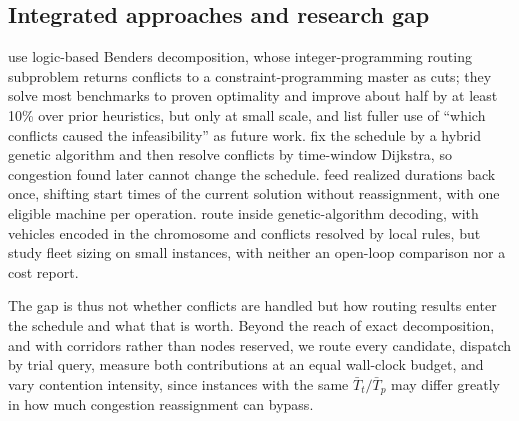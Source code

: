 \documentclass[preprint,review,12pt,authoryear,doubleblind]{elsarticle}
\begin{document}
\subsection{Integrated approaches and research gap}

 use logic-based Benders decomposition, whose integer-programming routing subproblem returns conflicts to a constraint-programming master as cuts; they solve most benchmarks to proven optimality and improve about half by at least 10\% over prior heuristics, but only at small scale, and list fuller use of ``which conflicts caused the infeasibility'' as future work.
\citet{sun2023integrated} fix the schedule by a hybrid genetic algorithm and then resolve conflicts by time-window Dijkstra, so congestion found later cannot change the schedule.
\citet{li2026framework} feed realized durations back once, shifting start times of the current solution without reassignment, with one eligible machine per operation.
\citet{lyu2019approach} route inside genetic-algorithm decoding, with vehicles encoded in the chromosome and conflicts resolved by local rules, but study fleet sizing on small instances, with neither an open-loop comparison nor a cost report.

The gap is thus not whether conflicts are handled but how routing results enter the schedule and what that is worth.
Beyond the reach of exact decomposition, and with corridors rather than nodes reserved, we route every candidate, dispatch by trial query, measure both contributions at an equal wall-clock budget, and vary contention intensity, since instances with the same $\bar{T}_t/\bar{T}_p$ may differ greatly in how much congestion reassignment can bypass.
\end{document}
